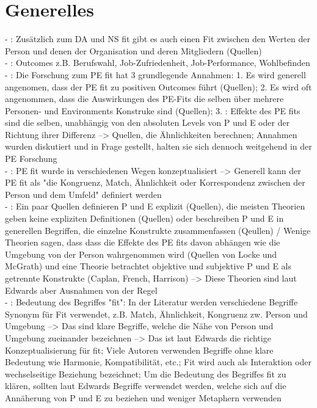 \section{Generelles}
\label{ch:notizen:generelles}
- \cite[S. 1]{edwards:2007}: Zusätzlich zum DA und NS fit gibt es auch einen Fit zwischen den Werten der Person und denen der Organisation und deren Mitgliedern (Quellen) \\
- \cite[S. 1]{edwards:2007}: Outcomes z.B. Berufswahl, Job-Zufriedenheit, Job-Performance, Wohlbefinden \\
- \cite[S. 1f.]{edwards:2007}: Die Forschung zum PE fit hat 3 grundlegende Annahmen: 1. Es wird generell angenomen, dass der PE fit zu positiven Outcomes führt (Quellen); 2. Es wird oft angenommen, dass die Auswirkungen des PE-Fits die selben über mehrere Personen- und Environments Konstruke sind (Quellen); 3. \cite[S. 2]{edwards:2007}: Effekte des PE fits sind die selben, unabhängig von den absoluten Levels von P und E oder der Richtung ihrer Differenz --> Quellen, die Ähnlichkeiten berechnen; Annahmen wurden diskutiert und in Frage gestellt, halten sie sich dennoch weitgehend in der PE Forschung \\ 
- \cite[S. 3]{edwards:2007}: PE fit wurde in verschiedenen Wegen konzeptualisiert --> Generell kann der PE fit als "die Kongruenz, Match, Ähnlichkeit oder Korrespondenz zwischen der Person und dem Umfeld" definiert werden\\
- \cite[S. 49]{edwards:2008}: Ein paar Quellen definieren P und E explizit (Quellen), die meisten Theorien geben keine expliziten Definitionen (Quellen) oder beschreiben P und E in generellen Begriffen, die einzelne Konstrukte zusammenfassen (Qeullen) / Wenige Theorien sagen, dass dass die Effekte des PE fits davon abhängen wie die Umgebung von der Person wahrgenommen wird (Quellen von Locke und McGrath) und eine Theorie betrachtet objektive und subjektive P und E als getrennte Konstrukte (Caplan, French, Harrison) --> Diese Theorien sind laut Edwards aber Ausnahmen von der Regel \\
- \cite[S. 53]{edwards:2008}: Bedeutung des Begriffes "fit": In der Literatur werden verschiedene Begriffe Synonym für Fit verwendet, z.B. Match, Ähnlichkeit, Kongruenz zw. Person und Umgebung --> Das sind klare Begriffe, welche die Nähe von Person und Umgebung zueinander bezeichnen --> Das ist laut Edwards die richtige Konzeptualisierung für fit; Viele Autoren verwenden Begriffe ohne klare Bedeutung wie Harmonie, Kompatibilität, etc.; Fit wird auch als Interaktion oder wechselseitige Beziehung bezeichnet; Um die Bedeutung des Begriffes fit zu klären, sollten laut Edwards Begriffe verwendet werden, welche sich auf die Annäherung von P und E zu beziehen und weniger Metaphern verwenden \\
